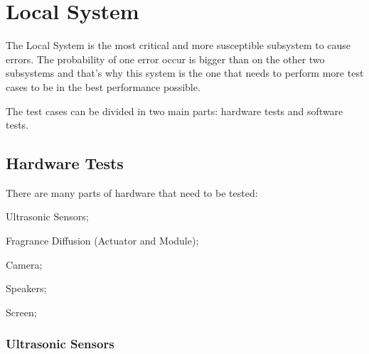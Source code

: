 \section{Local System}
\label{sec:test-ls}

The Local System is the most critical and more susceptible subsystem to cause errors. The probability of one error occur is bigger than on the other two subsystems and that's why this system is the one that needs to perform more test cases to be in the best performance possible.

The test cases can be divided in two main parts: hardware tests and software tests.

\subsection{Hardware Tests}
\label{subsec:ls-hw-tests}
%
There are many parts of hardware that need to be tested:
\begin{item-c}
\item Ultrasonic Sensors;
\item Fragrance Diffusion (Actuator and Module);
\item Camera;
\item Speakers;
\item Screen;
\end{item-c}

\subsubsection{Ultrasonic Sensors}
\label{sec:ussensors}

